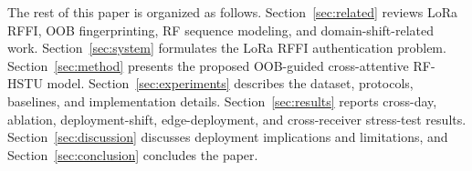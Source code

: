 The rest of this paper is organized as follows.
Section~\ref{sec:related} reviews LoRa RFFI, OOB fingerprinting, RF sequence modeling, and domain-shift-related work.
Section~\ref{sec:system} formulates the LoRa RFFI authentication problem.
Section~\ref{sec:method} presents the proposed OOB-guided cross-attentive RF-HSTU model.
Section~\ref{sec:experiments} describes the dataset, protocols, baselines, and implementation details.
Section~\ref{sec:results} reports cross-day, ablation, deployment-shift, edge-deployment, and cross-receiver stress-test results.
Section~\ref{sec:discussion} discusses deployment implications and limitations, and Section~\ref{sec:conclusion} concludes the paper.
